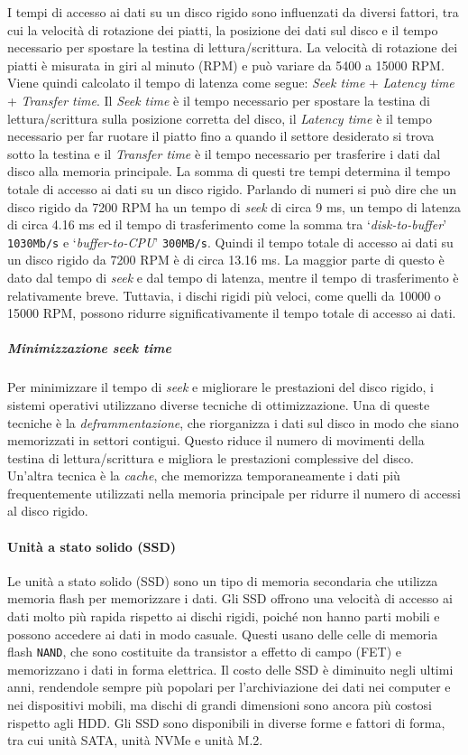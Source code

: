             I tempi di accesso ai dati su un disco rigido sono influenzati da diversi fattori, tra cui la velocità di rotazione dei piatti, la posizione dei dati sul disco e il tempo necessario per spostare la testina di lettura/scrittura. La velocità di rotazione dei piatti è misurata in giri al minuto (RPM) e può variare da 5400 a 15000 RPM. Viene quindi calcolato il tempo di latenza come segue: \textit{Seek time} + \textit{Latency time} + \textit{Transfer time}. Il \textit{Seek time} è il tempo necessario per spostare la testina di lettura/scrittura sulla posizione corretta del disco, il \textit{Latency time} è il tempo necessario per far ruotare il piatto fino a quando il settore desiderato si trova sotto la testina e il \textit{Transfer time} è il tempo necessario per trasferire i dati dal disco alla memoria principale. La somma di questi tre tempi determina il tempo totale di accesso ai dati su un disco rigido. Parlando di numeri si può dire che un disco rigido da 7200 RPM ha un tempo di \textit{seek} di circa 9 ms, un tempo di latenza di circa 4.16 ms ed il tempo di trasferimento come la somma tra `\textit{disk-to-buffer}' \texttt{1030Mb/s}  e `\textit{buffer-to-CPU}' \texttt{300MB/s}. Quindi il tempo totale di accesso ai dati su un disco rigido da 7200 RPM è di circa 13.16 ms. La maggior parte di questo è dato dal tempo di \textit{seek} e dal tempo di latenza, mentre il tempo di trasferimento è relativamente breve. Tuttavia, i dischi rigidi più veloci, come quelli da 10000 o 15000 RPM, possono ridurre significativamente il tempo totale di accesso ai dati.
        \subparagraph{Minimizzazione \textit{seek time}}
            Per minimizzare il tempo di \textit{seek} e migliorare le prestazioni del disco rigido, i sistemi operativi utilizzano diverse tecniche di ottimizzazione. Una di queste tecniche è la \textit{deframmentazione}, che riorganizza i dati sul disco in modo che siano memorizzati in settori contigui. Questo riduce il numero di movimenti della testina di lettura/scrittura e migliora le prestazioni complessive del disco. Un'altra tecnica è la \textit{cache}, che memorizza temporaneamente i dati più frequentemente utilizzati nella memoria principale per ridurre il numero di accessi al disco rigido.
    \paragraph{Unità a stato solido (SSD)}
        Le unità a stato solido (SSD) sono un tipo di memoria secondaria che utilizza memoria flash per memorizzare i dati. Gli SSD offrono una velocità di accesso ai dati molto più rapida rispetto ai dischi rigidi, poiché non hanno parti mobili e possono accedere ai dati in modo casuale. Questi usano delle celle di memoria flash \texttt{NAND}, che sono costituite da transistor a effetto di campo (FET) e memorizzano i dati in forma elettrica. Il costo delle SSD è diminuito negli ultimi anni, rendendole sempre più popolari per l'archiviazione dei dati nei computer e nei dispositivi mobili, ma dischi di grandi dimensioni sono ancora più costosi rispetto agli HDD. Gli SSD sono disponibili in diverse forme e fattori di forma, tra cui unità SATA, unità NVMe e unità M.2. 

